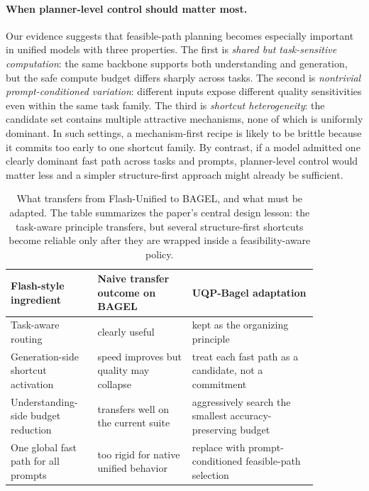 \documentclass{article}
\begin{document}
\paragraph{When planner-level control should matter most.} Our evidence suggests that feasible-path planning becomes especially important in unified models with three properties. The first is \emph{shared but task-sensitive computation}: the same backbone supports both understanding and generation, but the safe compute budget differs sharply across tasks. The second is \emph{nontrivial prompt-conditioned variation}: different inputs expose different quality sensitivities even within the same task family. The third is \emph{shortcut heterogeneity}: the candidate set contains multiple attractive mechanisms, none of which is uniformly dominant. In such settings, a mechanism-first recipe is likely to be brittle because it commits too early to one shortcut family. By contrast, if a model admitted one clearly dominant fast path across tasks and prompts, planner-level control would matter less and a simpler structure-first approach might already be sufficient.

\begin{table}[t]
\caption{What transfers from Flash-Unified to BAGEL, and what must be adapted. The table summarizes the paper's central design lesson: the task-aware principle transfers, but several structure-first shortcuts become reliable only after they are wrapped inside a feasibility-aware policy.}
\label{tab:transfer-lessons}
\centering
\small
\begin{tabular}{p{0.23\linewidth}p{0.27\linewidth}p{0.36\linewidth}}
\toprule
Flash-style ingredient & Naive transfer outcome on BAGEL & UQP-Bagel adaptation \\
\midrule
Task-aware routing & clearly useful & kept as the organizing principle \\
Generation-side shortcut activation & speed improves but quality may collapse & treat each fast path as a candidate, not a commitment \\
Understanding-side budget reduction & transfers well on the current suite & aggressively search the smallest accuracy-preserving budget \\
One global fast path for all prompts & too rigid for native unified behavior & replace with prompt-conditioned feasible-path selection \\
\bottomrule
\end{tabular}
\end{table}
\end{document}
